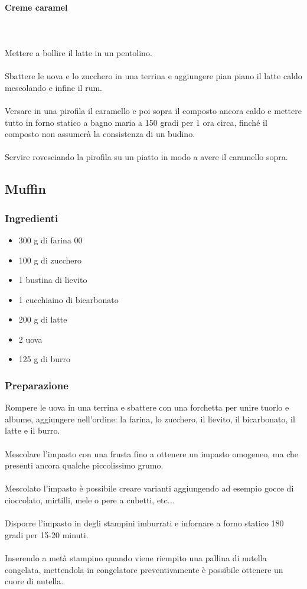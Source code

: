 \documentclass[12pt, a4paper]{article}
\begin{document}
	\paragraph{Creme caramel}\mbox{}\\\\
	Mettere a bollire il latte in un pentolino.\\\\
	Sbattere le uova e lo zucchero in una terrina e aggiungere pian piano il
	latte caldo mescolando e infine il rum.\\\\
	Versare in una pirofila il caramello e poi sopra il composto ancora caldo e
	mettere tutto in forno statico a bagno maria a 150 gradi per 1 ora circa, finché
	il composto non assumerà la consistenza di un budino.\\\\
	Servire rovesciando la pirofila su un piatto in modo a avere il caramello sopra.
\clearpage

\subsection{Muffin}

\subsubsection{Ingredienti}
\begin{itemize}
\item   300 g di farina 00
\item	100 g di zucchero
\item	1 bustina di lievito
\item	1 cucchiaino di bicarbonato
\item	200 g di latte
\item	2 uova
\item	125 g di burro
\end{itemize}

\subsubsection{Preparazione}
	Rompere le uova in una terrina e sbattere con una forchetta per unire tuorlo e 
	albume, aggiungere nell'ordine: la farina, lo zucchero, il lievito, il bicarbonato,
	il latte e il burro.\\\\
	Mescolare l'impasto con una frusta fino a ottenere un impasto omogeneo, ma che
	presenti ancora qualche piccolissimo grumo.\\\\
	Mescolato l'impasto è possibile creare varianti aggiungendo ad esempio gocce di
	cioccolato, mirtilli, mele o pere a cubetti, etc...\\\\
	Disporre l'impasto in degli stampini imburrati e infornare a forno statico 180
	gradi per 15-20 minuti.\\\\
	Inserendo a metà stampino quando viene riempito una pallina di nutella congelata,
	mettendola in congelatore preventivamente è possibile ottenere un cuore di nutella.
	
\clearpage


\clearpage
\end{document}
